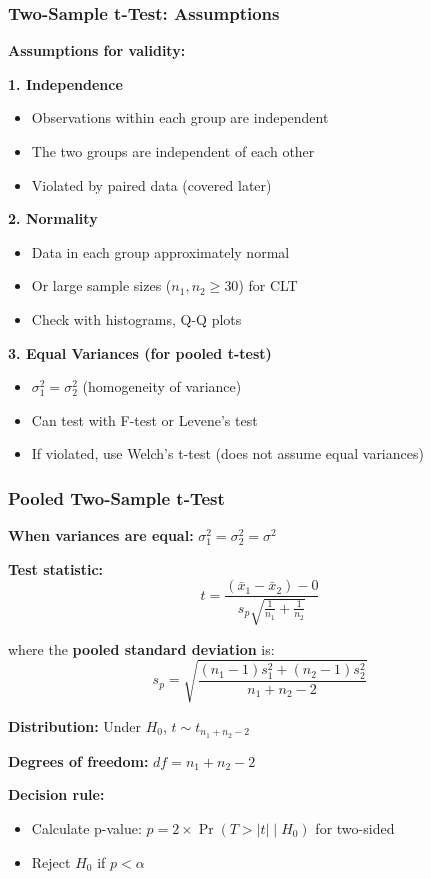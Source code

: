 \documentclass{beamer}
\begin{document}
\begin{frame}
\frametitle{Two-Sample t-Test: Assumptions}
\textbf{Assumptions for validity:}

\vspace{0.3cm}
\textbf{1. Independence}
\begin{itemize}
\item Observations within each group are independent
\item The two groups are independent of each other
\item Violated by paired data (covered later)
\end{itemize}

\vspace{0.3cm}
\textbf{2. Normality}
\begin{itemize}
\item Data in each group approximately normal
\item Or large sample sizes ($n_1, n_2 \geq 30$) for CLT
\item Check with histograms, Q-Q plots
\end{itemize}

\vspace{0.3cm}
\textbf{3. Equal Variances (for pooled t-test)}
\begin{itemize}
\item $\sigma_1^2 = \sigma_2^2$ (homogeneity of variance)
\item Can test with F-test or Levene's test
\item If violated, use Welch's t-test (does not assume equal variances)
\end{itemize}
\end{frame}

\begin{frame}
\frametitle{Pooled Two-Sample t-Test}
\textbf{When variances are equal:} $\sigma_1^2 = \sigma_2^2 = \sigma^2$

\vspace{0.3cm}
\textbf{Test statistic:}
$$t = \frac{(\bar{x}_1 - \bar{x}_2) - 0}{s_p \sqrt{\frac{1}{n_1} + \frac{1}{n_2}}}$$

where the \textbf{pooled standard deviation} is:
$$s_p = \sqrt{\frac{(n_1-1)s_1^2 + (n_2-1)s_2^2}{n_1 + n_2 - 2}}$$

\vspace{0.3cm}
\textbf{Distribution:} Under $H_0$, $t \sim t_{n_1 + n_2 - 2}$

\vspace{0.3cm}
\textbf{Degrees of freedom:} $df = n_1 + n_2 - 2$

\vspace{0.3cm}
\textbf{Decision rule:}
\begin{itemize}
\item Calculate p-value: $p = 2 \times \Pr(T > |t| \mid H_0)$ for two-sided
\item Reject $H_0$ if $p < \alpha$
\end{itemize}
\end{frame}
\end{document}
